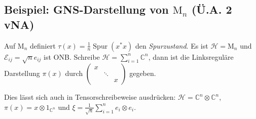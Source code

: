 \documentclass[11pt,a4paper]{scrartcl}
\newcommand{\C}{\mathbb{C}} %
\newcommand{\E}{\mathcal{E}}
\newcommand{\Hc}{\mathcal{H}}
\theoremstyle{plain}
\theoremstyle{definition}
\theoremstyle{remark}
\DeclareMathOperator{\Spur}{Spur}
\begin{document}
\subsection{Beispiel: GNS-Darstellung von $\mathrm{M}_n$ (Ü.A. 2 vNA)}

Auf $\mathrm{M}_n$ definiert $\tau(x)=\frac{1}{n} \Spur(x^*x)$ den \emph{Spurzustand}. Es ist $\Hc=\mathrm{M}_n$ und $\E_{ij}=\sqrt{n} e_{ij}$ ist ONB\@. Schreibe $\Hc=\sum_{i=1}^n \C^n$, dann ist die Linksreguläre Darstellung $\pi(x)$ durch $\left(\begin{smallmatrix} x & & \\ & \ddots & \\ & & x \end{smallmatrix}\right)$ gegeben.

Dies lässt sich auch in Tensorschreibeweise ausdrücken: $\Hc = \C^n\otimes \C^n$, $\pi(x)=x\otimes 1_{\C^n}$ und $\xi=\frac{1}{\sqrt{n}} \sum_{i=1}^n e_i\otimes e_i$.
\end{document}
